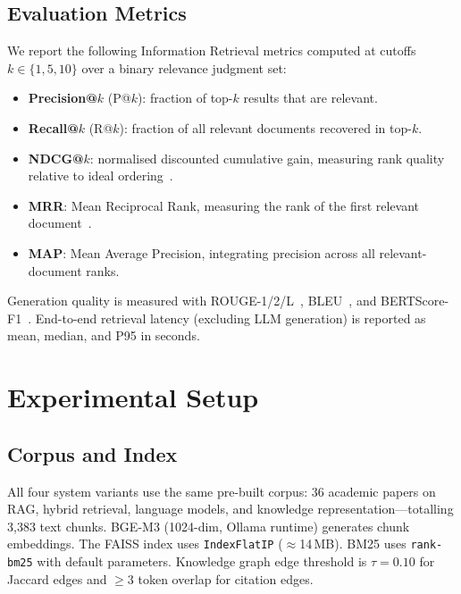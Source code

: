 \documentclass[journal]{IEEEtran}
\begin{document}
\subsection{Evaluation Metrics}
We report the following Information Retrieval metrics computed at
cutoffs $k \in \{1, 5, 10\}$ over a binary relevance judgment
set:
\begin{itemize}[leftmargin=1.5em,itemsep=1pt]
  \item \textbf{Precision@$k$} (P@$k$): fraction of top-$k$ results
    that are relevant.
  \item \textbf{Recall@$k$} (R@$k$): fraction of all relevant
    documents recovered in top-$k$.
  \item \textbf{NDCG@$k$}: normalised discounted cumulative gain,
    measuring rank quality relative to ideal ordering~\cite{jarvelin2002cumulated}.
  \item \textbf{MRR}: Mean Reciprocal Rank, measuring the rank of
    the first relevant document~\cite{voorhees1999trec}.
  \item \textbf{MAP}: Mean Average Precision, integrating precision
    across all relevant-document ranks.
\end{itemize}

Generation quality is measured with ROUGE-1/2/L~\cite{lin2004rouge},
BLEU~\cite{papineni2002bleu}, and BERTScore-F1~\cite{zhang2019bertscore}.
End-to-end retrieval latency (excluding LLM generation) is reported
as mean, median, and P95 in seconds.

\section{Experimental Setup}
\label{sec:setup}

\subsection{Corpus and Index}
All four system variants use the same pre-built corpus:
36 academic papers on RAG, hybrid retrieval, language models,
and knowledge representation—totalling 3,383 text chunks.
BGE-M3 (1024-dim, Ollama runtime) generates chunk embeddings.
The FAISS index uses \texttt{IndexFlatIP} ($\approx$14\,MB).
BM25 uses \texttt{rank-bm25} with default parameters.
Knowledge graph edge threshold is $\tau = 0.10$ for Jaccard edges
and $\geq 3$ token overlap for citation edges.
\end{document}
